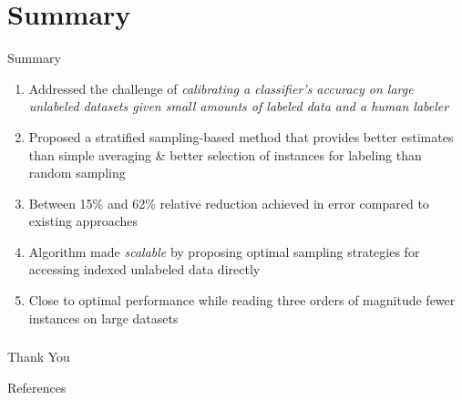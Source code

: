 \documentclass[11pt]{beamer}
\newlength{\wideitemsep}
\let\olditem\item
\renewcommand{\item}{\setlength{\itemsep}{\wideitemsep}\olditem}
\begin{document}
\begin{frame}
\end{frame}


\section{Summary}
\begin{frame}{Summary}
\begin{enumerate}
\item Addressed the challenge of \emph{calibrating a classifier's accuracy on large unlabeled datasets given small amounts of labeled data and a human labeler}
\item Proposed a stratified sampling-based method that provides better estimates than simple averaging \& better selection of instances for labeling than random sampling 
\item Between 15\% and 62\% relative reduction achieved in error compared to existing approaches
\item Algorithm made \emph{scalable} by proposing optimal sampling strategies for accessing indexed unlabeled data directly
\item Close to optimal performance while reading three orders of magnitude fewer instances on large datasets 
\end{enumerate}
\end{frame}

\begin{frame}
\frametitle{}
\begin{center}
\LARGE{Thank You}
\end{center}
\end{frame}


\begin{frame}[allowframebreaks]{References}

\end{frame}
\end{document}
